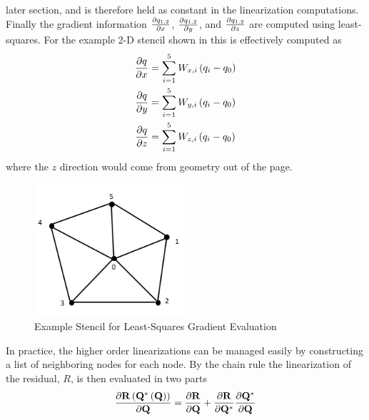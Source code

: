 later section, and is therefore held as constant in the linearization
computations.  Finally the gradient information $\frac{\partial q_{1,2}}{\partial x}$,
$\frac{\partial q_{1,2}}{\partial y}$, and $\frac{\partial q_{1,2}}{\partial z}$ are computed using least-squares.  For
the example 2-D stencil shown in  this is effectively
computed as
\begin{equation}
  \begin{aligned}
    \frac{\partial q}{\partial x} &= \sum_{i=1}^{5}{W_{x,i}\left( q_i - q_0 \right)} \\
    \frac{\partial q}{\partial y} &= \sum_{i=1}^{5}{W_{y,i}\left( q_i - q_0 \right)} \\
    \frac{\partial q}{\partial z} &= \sum_{i=1}^{5}{W_{z,i}\left( q_i - q_0 \right)}
  \end{aligned}
  \label{grad-construction}
\end{equation}
where the $z$ direction would come from geometry out of the page.
\begin{figure}[h]
  \centering
  \includegraphics[width=0.5\textwidth]{figures/stencil.png}
  \caption{Example Stencil for Least-Squares Gradient Evaluation}
  \label{fig:lsq-gradients}
\end{figure}
In practice, the higher order linearizations can be managed easily by
constructing a list of neighboring nodes for each node.  By the chain rule the
linearization of the residual, $R$, is then evaluated in two parts
\begin{equation}
  \frac{\partial \mathbf R\left(\mathbf Q^*\left( \mathbf Q \right) \right)}{\partial \mathbf Q} = 
  \frac{\partial \mathbf R}{\partial \mathbf Q} + \frac{\partial \mathbf R}{\partial \mathbf Q^{*}}\frac{\partial \mathbf Q^*}{\partial \mathbf Q}
  \label{residual-high-low}
\end{equation}
